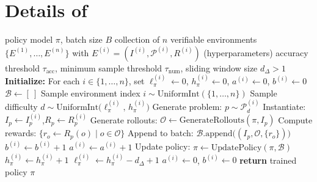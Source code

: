 \documentclass{article}
\theoremstyle{plain}
\theoremstyle{definition}
\theoremstyle{remark}
\begin{document}
\section{Details of \ours{}}
\label{app:rlve}
\begin{algorithm}[htbp]
\caption{Pseudocode for \ours{} (Reinforcement Learning with Adaptive Verifiable Environments). We focus on problem sampling, performance monitoring, and difficulty updates; any RL algorithm can be used to update the policy.}
\label{alg:rlve}
\begin{algorithmic}[1]
\REQUIRE policy model $\pi$, batch size $B$
\REQUIRE collection of $n$ verifiable environments $\{E^{(1)}, \ldots, E^{(n)}\}$ with $E^{(i)}=(I^{(i)}, \mathcal{P}^{(i)}, R^{(i)})$
\REQUIRE (hyperparameters) accuracy threshold $\tau_{\mathrm{acc}}$, minimum sample threshold $\tau_{\mathrm{num}}$, sliding window size $d_{\Delta}>1$
\STATE \textbf{Initialize:} For each $i \in \{1,\ldots,n\}$, set $\ell_\pi^{(i)} \gets 0$, $h_\pi^{(i)} \gets 0$, $a^{(i)} \gets 0$, $b^{(i)} \gets 0$
\STATE
{}
    \STATE $\mathcal{B} \gets [\ ]$ 
        \STATE Sample environment index $i \sim \text{UniformInt}(\{1,\ldots,n\})$
        \STATE Sample difficulty $d \sim \text{UniformInt}\big(\ell_\pi^{(i)},\, h_\pi^{(i)}\big)$
        \STATE Generate problem: $p \sim \mathcal{P}^{(i)}_{d}$
        \STATE Instantiate: $I_p \gets I^{(i)}_p$,$R_p \gets R^{(i)}_p$
        \STATE Generate rollouts: $\mathcal{O} \gets \text{GenerateRollouts}(\pi, I_p)$
        \STATE Compute rewards: $\{r_o \gets R_p(o) \mid o \in \mathcal{O}\}$
        \STATE Append to batch: $\mathcal{B}.\text{append}\big((I_p, \mathcal{O}, \{r_o\})\big)$
                \STATE $b^{(i)} \gets b^{(i)} + 1$
                    \STATE $a^{(i)} \gets a^{(i)} + 1$
                \ENDIF
            \ENDFOR
        \ENDIF
    \ENDFOR
    \STATE Update policy: $\pi \gets \text{UpdatePolicy}(\pi, \mathcal{B})$
        \STATE {}
                \STATE $h_\pi^{(i)} \gets h_\pi^{(i)} + 1$
                    \STATE $\ell_\pi^{(i)} \gets h_\pi^{(i)} - d_{\Delta} + 1$
                \ENDIF
            \ENDIF
            \STATE $a^{(i)} \gets 0$, $b^{(i)} \gets 0$
        \ENDIF
    \ENDFOR
\ENDWHILE
\STATE
\textbf{return} trained policy $\pi$
\end{algorithmic}
\end{algorithm}
\end{document}
